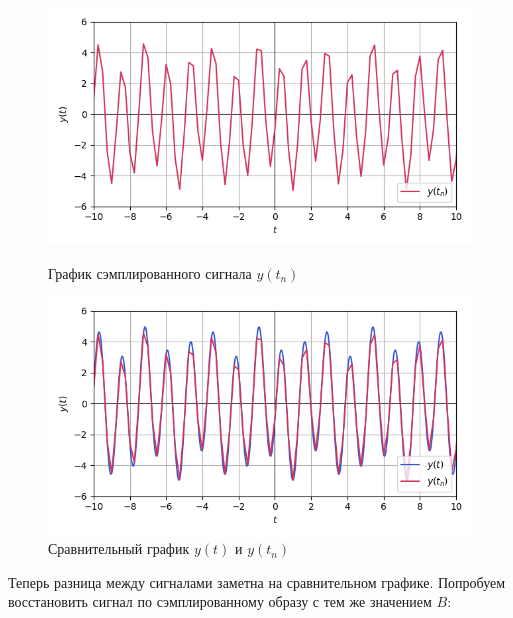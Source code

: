 \documentclass[a4paper]{article}
\begin{document}
\begin{figure}[H]
    \begin{minipage}{0.49\textwidth}
        \centering \includegraphics[width=\textwidth]{sources/second/sins dt=0.25 B=4/2_y_sampled.png}
        \caption{График сэмплированного сигнала $y(t_n)$}
    \end{minipage}\hfill
    \begin{minipage}{0.49\textwidth}
        \centering \includegraphics[width=\textwidth]{sources/second/sins dt=0.25 B=4/3_y_cmp(sampling).png}
        \caption{Сравнительный график $y(t)$ и $y(t_n)$}
    \end{minipage}
\end{figure}
Теперь разница между сигналами заметна на сравнительном графике.\newpage
Попробуем восстановить сигнал по сэмплированному образу с тем же значением $B$:
\end{document}
